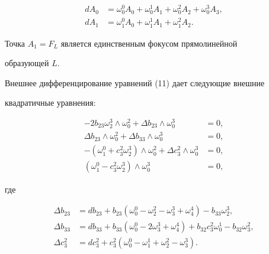 \begin{align*}


dA_0 &= \omega_0^0 A_0 + \omega_0^1 A_1 + \omega_0^2 A_2


+ \omega_0^{3} A_{3},\\


dA_1 &= \omega_1^0 A_0 + \omega_1^1 A_1 + \omega_1^2 A_2.


\end{align*}


Точка $A_1 = F_L$ является единственным фокусом прямолинейной


образующей $L$.





Внешнее дифференцирование уравнений (11) дает следующие внешние


квадратичные уравнения:


\begin{align}\label{eq:17}


- 2 b_{23} \omega_2^3 \wedge \omega_0^2 + \Delta b_{23}  \wedge


\omega_0^3  &= 0,\\


%


\label{eq:18}


\Delta b_{23} \wedge \omega_0^2 + \Delta b_{33}  \wedge \omega_0^3


&= 0, \\


%


\label{eq:19}


- (\omega_1^0 + c_3^2 \omega_2^3) \wedge \omega_0^2 + \Delta


c_{3}^2 \wedge \omega_0^3  &= 0, \\


%


\label{eq:20}


(\omega_1^0 - c_3^2 \omega_2^3)  \wedge \omega_0^3  &= 0,


\end{align}


где


\begin{align*}


\Delta b_{23} &= db_{23} + b_{23} (\omega_0^0  - \omega_2^2 -


\omega_3^3 + \omega_4^{4}) - b_{33} \omega_2^3, \\


\Delta b_{33} &= db_{33} + b_{33} (\omega_0^0 - 2\omega_3^3 + \omega_4^{4})


+ b_{32} c_3^2  \omega_0^1 - b_{32} \omega_3^2,\\


\Delta c_{3}^2 &= dc_{3}^2 + c_{3}^2 (\omega_0^0 - \omega_1^1 + \omega_2^2


- \omega_3^{3}).


\end{align*}


